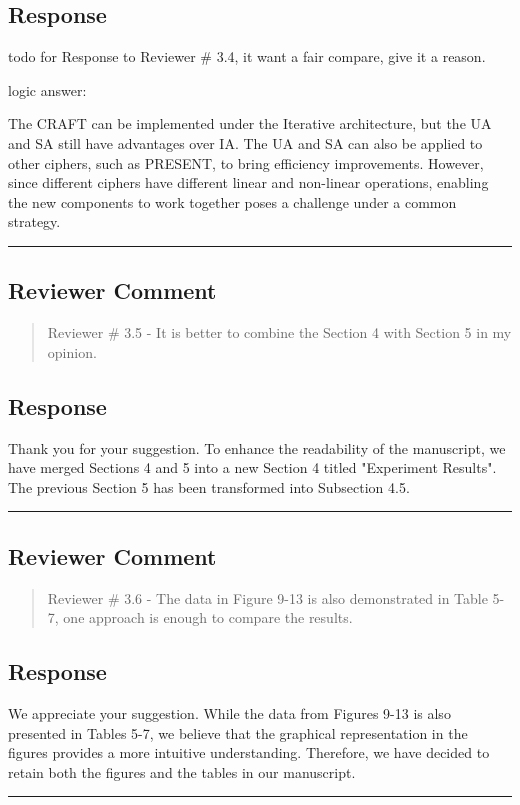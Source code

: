 \subsection{Response}

todo for Response to Reviewer \# 3.4, it want a fair compare, give it a reason.

logic answer:

The CRAFT can be implemented under the Iterative architecture, but the UA and SA still have advantages over IA. The UA and SA can also be applied to other ciphers, such as PRESENT, to bring efficiency improvements. However, since different ciphers have different linear and non-linear operations, enabling the new components to work together poses a challenge under a common strategy.

\noindent\rule{\linewidth}{2.0pt}

\subsection{Reviewer Comment}
\begin{mdframed}
	\begin{quote}
		Reviewer \# 3.5 - It is better to combine the Section 4 with Section 5 in my opinion.
	\end{quote}
\end{mdframed}

\subsection{Response}

Thank you for your suggestion. To enhance the readability of the manuscript, we have merged Sections 4 and 5 into a new Section 4 titled "Experiment Results". The previous Section 5 has been transformed into Subsection 4.5.

\noindent\rule{\linewidth}{2.0pt}

\subsection{Reviewer Comment}
\begin{mdframed}
	\begin{quote}
		Reviewer \# 3.6 - The data in Figure 9-13 is also demonstrated in Table 5-7, one approach is enough to compare the results.
	\end{quote}
\end{mdframed}

\subsection{Response}

We appreciate your suggestion. While the data from Figures 9-13 is also presented in Tables 5-7, we believe that the graphical representation in the figures provides a more intuitive understanding. Therefore, we have decided to retain both the figures and the tables in our manuscript.

\noindent\rule{\linewidth}{6.0pt}